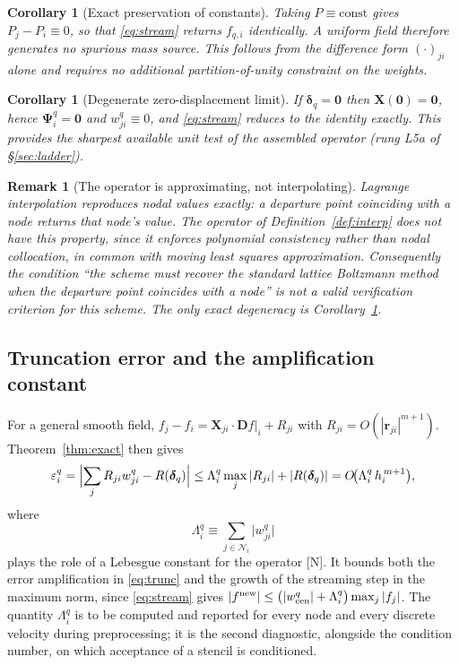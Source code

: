 \documentclass[11pt,a4paper]{article}
\newcommand{\rji}{\bm{r}_{ji}}
\newcommand{\New}{\textcolor{blue!60!black}{\textsf{[N]}}}
\newtheorem{corollary}[theorem]{Corollary}
\newtheorem{remark}{Remark}
\begin{document}
\begin{corollary}[Exact preservation of constants]
\label{cor:const}
Taking $P\equiv\text{const}$ gives $P_j-P_i\equiv0$, so that \eqref{eq:stream} returns
$f_{q,i}$ identically. A uniform field therefore generates no spurious mass source.
This follows from the difference form $(\cdot)_{ji}$ alone and requires no additional
partition-of-unity constraint on the weights.
\end{corollary}

\begin{corollary}[Degenerate zero-displacement limit]
\label{cor:zero}
If $\bm\delta_q=\bm 0$ then $\bm X(\bm 0)=\bm 0$, hence $\bm\Psi^{q}_i=\bm 0$ and
$w^{q}_{ji}\equiv0$, and \eqref{eq:stream} reduces to the identity exactly. This
provides the sharpest available unit test of the assembled operator (rung L5a of
\S\ref{sec:ladder}).
\end{corollary}

\begin{remark}[The operator is approximating, not interpolating]
\label{rem:noninterp}
Lagrange interpolation reproduces nodal values exactly: a departure point coinciding
with a node returns that node's value. The operator of Definition~\ref{def:interp} does
not have this property, since it enforces polynomial consistency rather than nodal
collocation, in common with moving least squares approximation. Consequently the
condition ``the scheme must recover the standard lattice Boltzmann method when the
departure point coincides with a node'' is \emph{not} a valid verification criterion
for this scheme. The only exact degeneracy is Corollary~\ref{cor:zero}.
\end{remark}

\subsection{Truncation error and the amplification constant}

For a general smooth field, $f_j-f_i=\bm X_{ji}\cdot\bm Df|_i+R_{ji}$ with
$R_{ji}=O(|\rji|^{m+1})$. Theorem~\ref{thm:exact} then gives
\begin{equation}
\varepsilon^{q}_i
=\Bigl|\sum_{j}R_{ji}w^{q}_{ji}-R(\bm\delta_q)\Bigr|
\le\Lambda^{q}_i\max_{j}|R_{ji}|+|R(\bm\delta_q)|
=O\!\bigl(\Lambda^{q}_i\,h_i^{\,m+1}\bigr),
\label{eq:trunc}
\end{equation}
where
\begin{equation}
\boxed{\ \Lambda^{q}_i\equiv\sum_{j\in\mathcal N_i}\bigl|w^{q}_{ji}\bigr|\ }
\label{eq:lebesgue}
\end{equation}
plays the role of a Lebesgue constant for the operator \New. It bounds both the error
amplification in \eqref{eq:trunc} and the growth of the streaming step in the maximum
norm, since \eqref{eq:stream} gives
$|f^{\rm new}|\le\bigl(|w^{q}_{\rm cen}|+\Lambda^{q}_i\bigr)\max_j|f_j|$. The quantity
$\Lambda^{q}_i$ is to be computed and reported for every node and every discrete
velocity during preprocessing; it is the second diagnostic, alongside the condition
number, on which acceptance of a stencil is conditioned.
\end{document}
